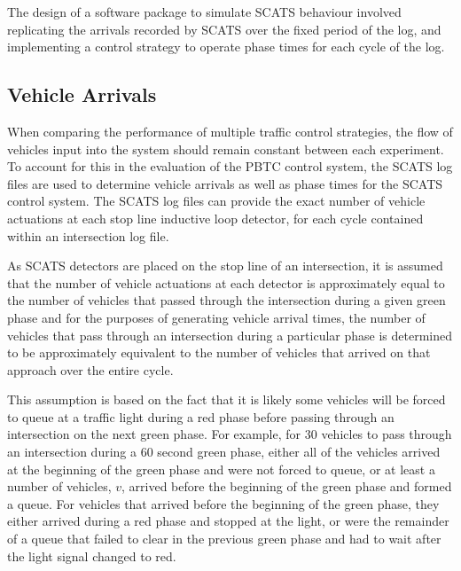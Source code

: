 The design of a software package to simulate SCATS behaviour involved replicating the arrivals recorded by SCATS over the fixed period of the log, and implementing a control strategy to operate phase times for each cycle of the log.


\subsection{Vehicle Arrivals}


When comparing the performance of multiple traffic control strategies, the flow of vehicles input into the system should remain constant between each experiment. To account for this in the evaluation of the PBTC control system, the SCATS log files are used to determine vehicle arrivals as well as phase times for the SCATS control system. The SCATS log files can provide the exact number of vehicle actuations at each stop line inductive loop detector, for each cycle contained within an intersection log file. 

As SCATS detectors are placed on the stop line of an intersection, it is assumed that the number of vehicle actuations at each detector is approximately equal to the number of vehicles that passed through the intersection during a given green phase and for the purposes of generating vehicle arrival times, the number of vehicles that pass through an intersection during a particular phase is determined to be approximately equivalent to the number of vehicles that arrived on that approach over the entire cycle. 

This assumption is based on the fact that it is likely some vehicles will be forced to queue at a traffic light during a red phase before passing through an intersection on the next green phase. For example, for 30 vehicles to pass through an intersection during a 60 second green phase, either all of the vehicles arrived at the beginning of the green phase and were not forced to queue, or at least a number of vehicles, $v$, arrived before the beginning of the green phase and formed a queue. For vehicles that arrived before the beginning of the green phase, they either arrived during a red phase and stopped at the light, or were the remainder of a queue that failed to clear in the previous green phase and had to wait after the light signal changed to red. 

